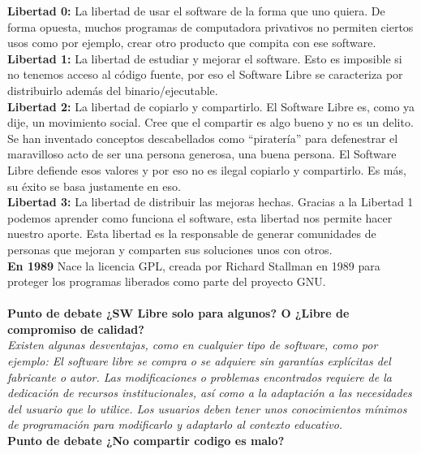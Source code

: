 {\bf Libertad 0:}
La libertad de usar el software de la forma que uno quiera. De forma opuesta, muchos programas de computadora privativos no permiten ciertos usos como por ejemplo, crear otro producto que compita con ese software.
\\
{\bf Libertad 1:}
La libertad de estudiar y mejorar el software. Esto es imposible si no tenemos acceso al código fuente, por eso el Software Libre se caracteriza por distribuirlo además del binario/ejecutable.
\\
{\bf Libertad 2:}
La libertad de copiarlo y compartirlo. El Software Libre es, como ya dije, un movimiento social. Cree que el compartir es algo bueno y no es un delito. Se han inventado conceptos descabellados como “piratería” para defenestrar el maravilloso acto de ser una persona generosa, una buena persona. El Software Libre defiende esos valores y por eso no es ilegal copiarlo y compartirlo. Es más, su éxito se basa justamente en eso.
\\
{\bf Libertad 3:}
La libertad de distribuir las mejoras hechas. Gracias a la Libertad 1 podemos aprender como funciona el software, esta libertad nos permite hacer nuestro aporte. Esta libertad es la responsable de generar comunidades de personas que mejoran y comparten sus soluciones unos con otros.
\\
{\bf En 1989} Nace la licencia GPL, creada por Richard Stallman en 1989 para proteger los programas liberados como parte del proyecto GNU.
\\
\\
{\bf Punto de debate ¿SW Libre solo para algunos? O ¿Libre de compromiso de calidad?}
{\it 
\\
Existen algunas desventajas, como en cualquier tipo de software, como por ejemplo:
El software libre se compra o se adquiere sin garantías explícitas del fabricante o autor.
Las modificaciones o problemas encontrados requiere de la dedicación de recursos institucionales, así como a la adaptación a las necesidades del usuario que lo utilice.
Los usuarios deben tener unos conocimientos mínimos de programación para modificarlo y adaptarlo al contexto educativo.
}
\\
{\bf Punto de debate ¿No compartir codigo es malo? }
